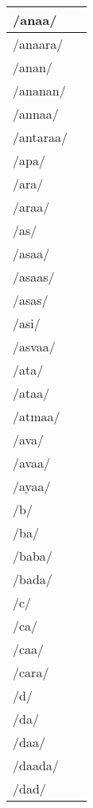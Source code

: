 \documentclass{article}
\begin{document}
\begin{longtable}{|l|p{}|}
/anaa/ & \textIndus{} \\ \hline
/anaara/ & \textIndus{} \\ \hline
/anan/ & \textIndus{} \\ \hline
/ananan/ & \textIndus{} \\ \hline
/annaa/ & \textIndus{} \\ \hline
/antaraa/ & \textIndus{} \\ \hline
/apa/ & \textIndus{} \\ \hline
/ara/ & \textIndus{} \\ \hline
/araa/ & \textIndus{} \\ \hline
/as/ & \textIndus{} \\ \hline
/asaa/ & \textIndus{} \\ \hline
/asaas/ & \textIndus{} \\ \hline
/asas/ & \textIndus{} \\ \hline
/asi/ & \textIndus{} \\ \hline
/asvaa/ & \textIndus{} \\ \hline
/ata/ & \textIndus{} \\ \hline
/ataa/ & \textIndus{} \\ \hline
/atmaa/ & \textIndus{} \\ \hline
/ava/ & \textIndus{} \\ \hline
/avaa/ & \textIndus{} \\ \hline
/ayaa/ & \textIndus{} \\ \hline
/b/ & \textIndus{} \\ \hline
/ba/ & \textIndus{} \\ \hline
/baba/ & \textIndus{} \\ \hline
/bada/ & \textIndus{} \\ \hline
/c/ & \textIndus{} \\ \hline
/ca/ & \textIndus{} \\ \hline
/caa/ & \textIndus{} \\ \hline
/cara/ & \textIndus{} \\ \hline
/d/ & \textIndus{} \\ \hline
/da/ & \textIndus{} \\ \hline
/daa/ & \textIndus{} \\ \hline
/daada/ & \textIndus{} \\ \hline
/dad/ & \textIndus{} \\ \hline

\end{longtable}
\end{document}
